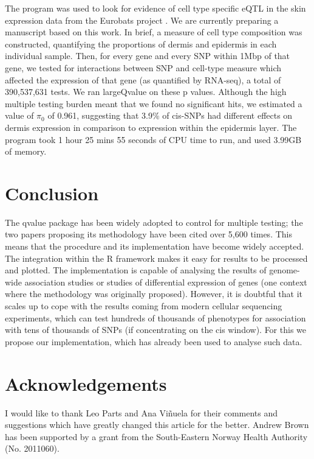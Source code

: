 \documentclass{amsart}
\begin{document}
The program was used to look for evidence of cell type specific eQTL in the skin expression data from the Eurobats project \citep{brownepistasis}. We are currently preparing a manuscript based on this work. In brief, a measure of cell type composition was constructed, quantifying the proportions of dermis and epidermis in each individual sample. Then, for every gene and every SNP within 1Mbp of that gene, we tested for interactions between SNP and cell-type measure which affected the expression of that gene (as quantified by RNA-seq), a total of 390,537,631 tests. We ran largeQvalue on these p values. Although the high multiple testing burden meant that we found no significant hits, we estimated a value of $\pi_0$ of 0.961, suggesting that 3.9\% of cis-SNPs had different effects on dermis expression in comparison to expression within the epidermis layer. The program took 1 hour 25 mins 55 seconds of CPU time to run, and used 3.99GB of memory.

\section{Conclusion}

The qvalue package has been widely adopted to control for multiple testing; the two papers proposing its methodology \citep{splinestorey, bootstorey} have been cited over 5,600 times. This means that the procedure and its implementation have become widely accepted. The integration within the R framework makes it easy for results to be processed and plotted. The implementation is capable of analysing the results of genome-wide association studies or studies of differential expression of genes (one context where the methodology was originally proposed). However, it is doubtful that it scales up to cope with the results coming from modern cellular sequencing experiments, which can test hundreds of thousands of phenotypes for association with tens of thousands of SNPs (if concentrating on the cis window). For this we propose our implementation, which has already been used to analyse such data.

\section{Acknowledgements}

I would like to thank Leo Parts and Ana Vi\~{n}uela for their comments and suggestions which have greatly changed this article for the better. Andrew Brown has been supported by a grant from the South-Eastern Norway Health Authority (No. 2011060).

	
\end{document}
